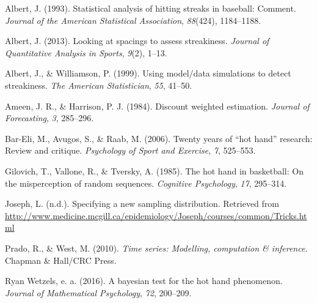 \documentclass[12pt,twoside]{dukestatscithesis}
\theoremstyle{definition}
\theoremstyle{definition}
\theoremstyle{definition}
\theoremstyle{remark}
\begin{document}
\hypertarget{refs}{}
\hypertarget{ref-albert93}{}
Albert, J. (1993). Statistical analysis of hitting streaks in baseball:
Comment. \emph{Journal of the American Statistical Association},
\emph{88}(424), 1184--1188.

\hypertarget{ref-albert13}{}
Albert, J. (2013). Looking at spacings to assess streakiness.
\emph{Journal of Quantitative Analysis in Sports}, \emph{9}(2), 1--13.

\hypertarget{ref-albert99}{}
Albert, J., \& Williamson, P. (1999). Using model/data simulations to
detect streakiness. \emph{The American Statistician}, \emph{55}, 41--50.

\hypertarget{ref-ameen84}{}
Ameen, J. R., \& Harrison, P. J. (1984). Discount weighted estimation.
\emph{Journal of Forecasting}, \emph{3}, 285--296.

\hypertarget{ref-bareli06}{}
Bar-Eli, M., Avugos, S., \& Raab, M. (2006). Twenty years of ``hot
hand'' research: Review and critique. \emph{Psychology of Sport and
Exercise}, \emph{7}, 525--553.

\hypertarget{ref-gilovich85}{}
Gilovich, T., Vallone, R., \& Tversky, A. (1985). The hot hand in
basketball: On the misperception of random sequences. \emph{Cognitive
Psychology}, \emph{17}, 295--314.

\hypertarget{ref-joseph}{}
Joseph, L. (n.d.). Specifying a new sampling distribution. Retrieved
from
\url{http://www.medicine.mcgill.ca/epidemiology/Joseph/courses/common/Tricks.html}

\hypertarget{ref-west10}{}
Prado, R., \& West, M. (2010). \emph{Time series: Modelling, computation
\& inference}. Chapman \& Hall/CRC Press.

\hypertarget{ref-wetzels16}{}
Ryan Wetzels, e. a. (2016). A bayesian test for the hot hand phenomenon.
\emph{Journal of Mathematical Psychology}, \emph{72}, 200--209.


\end{document}
